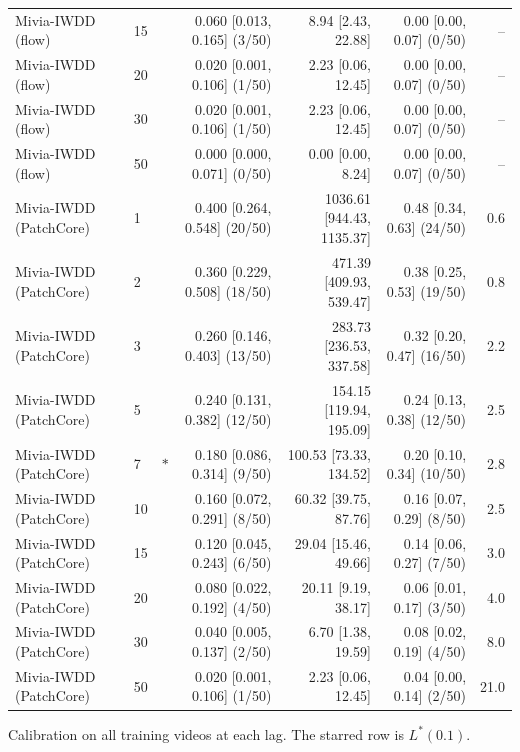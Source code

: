 \begin{table}[t]
{\begin{tabular}{llcrrrr}
Mivia-IWDD (flow) & 15 &  & 0.060 [0.013, 0.165] (3/50) & 8.94 [2.43, 22.88] & 0.00 [0.00, 0.07] (0/50) & -- \\
Mivia-IWDD (flow) & 20 &  & 0.020 [0.001, 0.106] (1/50) & 2.23 [0.06, 12.45] & 0.00 [0.00, 0.07] (0/50) & -- \\
Mivia-IWDD (flow) & 30 &  & 0.020 [0.001, 0.106] (1/50) & 2.23 [0.06, 12.45] & 0.00 [0.00, 0.07] (0/50) & -- \\
Mivia-IWDD (flow) & 50 &  & 0.000 [0.000, 0.071] (0/50) & 0.00 [0.00, 8.24] & 0.00 [0.00, 0.07] (0/50) & -- \\
Mivia-IWDD (PatchCore) & 1 &  & 0.400 [0.264, 0.548] (20/50) & 1036.61 [944.43, 1135.37] & 0.48 [0.34, 0.63] (24/50) & 0.6 \\
Mivia-IWDD (PatchCore) & 2 &  & 0.360 [0.229, 0.508] (18/50) & 471.39 [409.93, 539.47] & 0.38 [0.25, 0.53] (19/50) & 0.8 \\
Mivia-IWDD (PatchCore) & 3 &  & 0.260 [0.146, 0.403] (13/50) & 283.73 [236.53, 337.58] & 0.32 [0.20, 0.47] (16/50) & 2.2 \\
Mivia-IWDD (PatchCore) & 5 &  & 0.240 [0.131, 0.382] (12/50) & 154.15 [119.94, 195.09] & 0.24 [0.13, 0.38] (12/50) & 2.5 \\
Mivia-IWDD (PatchCore) & 7 & $\ast$ & 0.180 [0.086, 0.314] (9/50) & 100.53 [73.33, 134.52] & 0.20 [0.10, 0.34] (10/50) & 2.8 \\
Mivia-IWDD (PatchCore) & 10 &  & 0.160 [0.072, 0.291] (8/50) & 60.32 [39.75, 87.76] & 0.16 [0.07, 0.29] (8/50) & 2.5 \\
Mivia-IWDD (PatchCore) & 15 &  & 0.120 [0.045, 0.243] (6/50) & 29.04 [15.46, 49.66] & 0.14 [0.06, 0.27] (7/50) & 3.0 \\
Mivia-IWDD (PatchCore) & 20 &  & 0.080 [0.022, 0.192] (4/50) & 20.11 [9.19, 38.17] & 0.06 [0.01, 0.17] (3/50) & 4.0 \\
Mivia-IWDD (PatchCore) & 30 &  & 0.040 [0.005, 0.137] (2/50) & 6.70 [1.38, 19.59] & 0.08 [0.02, 0.19] (4/50) & 8.0 \\
Mivia-IWDD (PatchCore) & 50 &  & 0.020 [0.001, 0.106] (1/50) & 2.23 [0.06, 12.45] & 0.04 [0.00, 0.14] (2/50) & 21.0 \\
\bottomrule
\end{tabular}}
\begin{minipage}{\linewidth}\vspace{2pt}\footnotesize Calibration on all training videos at each lag. The starred row is $L^\ast(0.1)$.\end{minipage}
\end{table}
